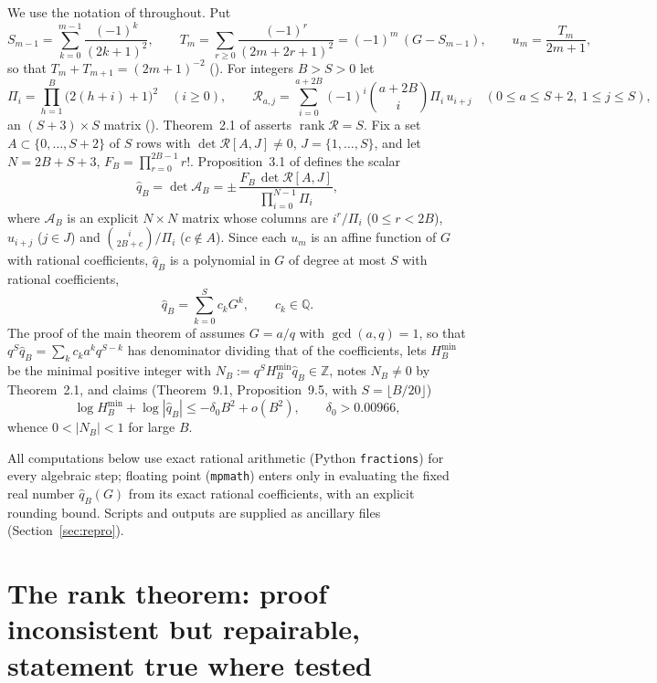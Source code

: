 \documentclass[11pt]{amsart}
\theoremstyle{definition}
\newcommand{\Z}{\mathbb{Z}}
\newcommand{\Q}{\mathbb{Q}}
\newcommand{\qhat}{\widehat{q}}
\DeclareMathOperator{\rank}{rank}
\begin{document}
We use the notation of \cite{Sun26} throughout. Put
\[
S_{m-1}=\sum_{k=0}^{m-1}\frac{(-1)^k}{(2k+1)^2},\qquad
T_m=\sum_{r\ge0}\frac{(-1)^r}{(2m+2r+1)^2}=(-1)^m\,(G-S_{m-1}),\qquad
u_m=\frac{T_m}{2m+1},
\]
so that $T_m+T_{m+1}=(2m+1)^{-2}$ (\cite[(1.1)--(1.4)]{Sun26}). For integers $B>S>0$ let
\[
\Pi_i=\prod_{h=1}^{B}\bigl(2(h+i)+1\bigr)^2\quad(i\ge0),\qquad
\mathcal R_{a,j}=\sum_{i=0}^{a+2B}(-1)^i\binom{a+2B}{i}\Pi_i\,u_{i+j}\quad(0\le a\le S+2,\ 1\le j\le S),
\]
an $(S+3)\times S$ matrix (\cite[(2.1)]{Sun26}). Theorem~2.1 of \cite{Sun26} asserts $\rank\mathcal R=S$.
Fix a set $A\subset\{0,\dots,S+2\}$ of $S$ rows with $\det\mathcal R[A,J]\ne0$, $J=\{1,\dots,S\}$, and let
$N=2B+S+3$, $F_B=\prod_{r=0}^{2B-1}r!$. Proposition~3.1 of \cite{Sun26} defines the scalar
\begin{equation}\label{eq:qhat}
\qhat_B=\det\mathcal A_B=\pm\,\frac{F_B\,\det\mathcal R[A,J]}{\prod_{i=0}^{N-1}\Pi_i},
\end{equation}
where $\mathcal A_B$ is an explicit $N\times N$ matrix whose columns are $i^r/\Pi_i$ ($0\le r<2B$), $u_{i+j}$
($j\in J$) and $\binom{i}{2B+c}/\Pi_i$ ($c\notin A$). Since each $u_m$ is an affine function of $G$ with rational
coefficients, $\qhat_B$ is a polynomial in $G$ of degree at most $S$ with rational coefficients,
\begin{equation}\label{eq:poly}
\qhat_B=\sum_{k=0}^{S}c_kG^k,\qquad c_k\in\Q .
\end{equation}
The proof of the main theorem of \cite{Sun26} assumes $G=a/q$ with $\gcd(a,q)=1$, so that $q^S\qhat_B=\sum_k c_ka^kq^{S-k}$ has denominator dividing that of the coefficients, lets $H_B^{\min}$ be the minimal positive integer with
$N_B:=q^SH_B^{\min}\qhat_B\in\Z$, notes $N_B\ne0$ by Theorem~2.1, and claims (Theorem~9.1, Proposition~9.5,
with $S=\lfloor B/20\rfloor$)
\begin{equation}\label{eq:claim}
\log H_B^{\min}+\log|\qhat_B|\le-\delta_0B^2+o(B^2),\qquad\delta_0>0.00966,
\end{equation}
whence $0<|N_B|<1$ for large $B$.

All computations below use exact rational arithmetic (Python \texttt{fractions}) for every algebraic step;
floating point (\texttt{mpmath}) enters only in evaluating the fixed real number $\qhat_B(G)$ from its exact
rational coefficients, with an explicit rounding bound. Scripts and outputs are supplied as ancillary files
(Section~\ref{sec:repro}).

\section{The rank theorem: proof inconsistent but repairable, statement true where tested}
\end{document}
